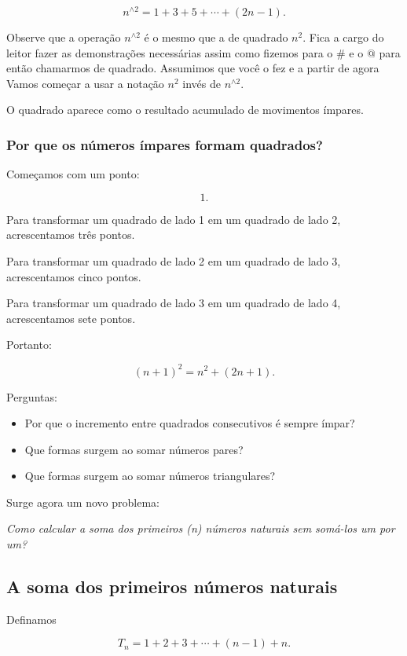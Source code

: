 \documentclass[12pt,a4paper]{article}
\makeatletter
\newcommand{\mov}{\mathbin{\#}}
\newcommand{\rep}{\mathbin{@}}
\makeatother
\begin{document}
\[
n^{\wedge 2}=1+3+5+\cdots+(2n-1).
\]

Observe que a operação $n^{\wedge 2}$ é o mesmo que a de quadrado $n^2$. Fica a cargo do leitor fazer as demonstrações necessárias 
assim como fizemos para o $\mov$ e o $\rep$ para então chamarmos de quadrado. Assumimos que você o fez e a partir de agora Vamos
começar a usar a notação $n^2$ invés de $n^{\wedge 2}$.

O quadrado aparece como o resultado acumulado de movimentos ímpares.

\subsubsection{Por que os números ímpares formam quadrados?}

Começamos com um ponto:

\[
1.
\]

Para transformar um quadrado de lado 1 em um quadrado de lado 2, acrescentamos três pontos.

Para transformar um quadrado de lado 2 em um quadrado de lado 3, acrescentamos cinco pontos.

Para transformar um quadrado de lado 3 em um quadrado de lado 4, acrescentamos sete pontos.

Portanto:

\[
(n+1)^2=n^2+(2n+1).
\]

Perguntas:

\begin{itemize}
    \item Por que o incremento entre quadrados consecutivos é sempre ímpar?
    \item Que formas surgem ao somar números pares?
    \item Que formas surgem ao somar números triangulares?
\end{itemize}

Surge agora um novo problema:

\begin{center}
\emph{Como calcular a soma dos primeiros (n) números naturais sem
somá-los um por um?}
\end{center}

\subsection{A soma dos primeiros números naturais}

Definamos

\[
T_n=1+2+3+\cdots+(n-1)+n.
\]
\end{document}
